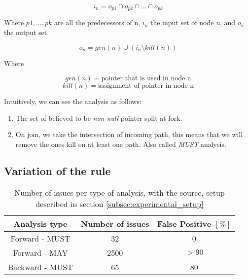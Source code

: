 \begin{equation}\label{eqn:dataflow1}
i_{n} = o_{p1}  \cap   o_{p2}  \cap  ... \cap   o_{pk}
\end{equation}

Where $p1, ..., pk$ are all the predecessors of n, $i_{n}$ the input set of node \emph{n}, and  $o_{n}$ the output set.

\begin{equation}\label{eqn:dataflow2}
o_{n} = gen(n)  \cup   (i_{n} \setminus kill(n))
\end{equation}

Where

\begin{equation}\label{eqn:dataflow3}
gen(n) =\text{pointer that is used in node n}
\end{equation}
\begin{equation}\label{eqn:dataflow4}
kill(n) = \text{assignment of pointer in node n}
\end{equation}

Intuitively, we can see the analysis as follows:
\begin{enumerate}
	\item The set of believed to be \emph{non-null} pointer split at fork. \newline 
	\item On join, we take the intersection of incoming path, this means that we will remove the ones kill on at least one path. Also called \emph{MUST} analysis. \newline 
\end{enumerate}

\subsection{Variation of the rule}
\label{subsec:rule_variation}

\begin{table}[h]
	\centering
	\caption{Number of issues per type of analysis, with the source, setup described in section \ref{subsec:experimental_setup}}
	\label{table:issue_per_analysis_type}
	\begin{tabular}{|c|c|c|}
		\hline
		\bf Analysis type &  \bf Number of issues &  \bf False Positive $[\%]$ \\ \hline
		Forward - MUST &  32 &  0 \\ 
		Forward - MAY &  2500 & $> 90$  \\ 
		Backward - MUST &  65 & 80 \\ \hline
	\end{tabular}
\end{table}

